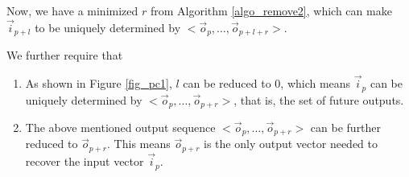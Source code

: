 \documentclass[twocolumn]{article}
\begin{document}
% 
% 

Now, 
we have a minimized $r$ from Algorithm \ref{algo_remove2},
which can make $\vec{i}_{p+l}$ to be uniquely determined by $<\vec{o}_{p},\dots,\vec{o}_{p+l+r}>$.

We further require that 
\begin{enumerate}
 \item As shown in Figure \ref{fig_pc1},
 $l$ can be reduced to 0,
 which means $\vec{i}_{p}$ can be uniquely determined by $<\vec{o}_{p},\dots,\vec{o}_{p+r}>$,
 that is,
 the set of future outputs.
 \item The above mentioned output sequence $<\vec{o}_{p},\dots,\vec{o}_{p+r}>$ 
 can be further reduced to $\vec{o}_{p+r}$.
 This means $\vec{o}_{p+r}$ is the only output vector needed to recover the input vector $\vec{i}_p$.
\end{enumerate}
\end{document}
